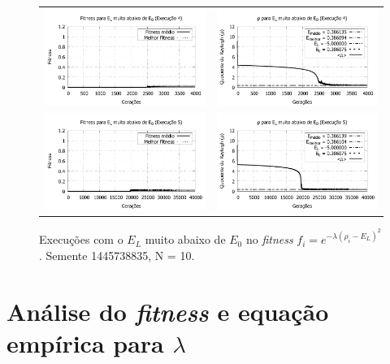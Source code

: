 \begin{figure}[p]
\begin{tabular}{@{}cc@{}}
		\includegraphics[width=.40\textwidth]{figs/resultados/variandoEL/T4E4_fitness-extendido.pdf} &
    \includegraphics[width=.40\textwidth]{figs/resultados/variandoEL/T4E4_rho_extendido.pdf}   \\
		
		\includegraphics[width=.40\textwidth]{figs/resultados/variandoEL/T4E5_fitness-extendido.pdf} &
    \includegraphics[width=.40\textwidth]{figs/resultados/variandoEL/T4E5_rho_extendido.pdf}
		
  \end{tabular}
  \caption{Execuções com o $E_L$ muito abaixo de $E_0$ no \textit{fitness} $f_i = e^{-\lambda(\rho_i - E_L)^2}$. Semente 1445738835, N = 10.}
	\label{fig:variando_EL_muito_abaixo}
	\end{figure}
	
	
	\section{Análise do \emph{fitness} e equação empírica para $\lambda$}\label{sec:eq_lambda}
	
